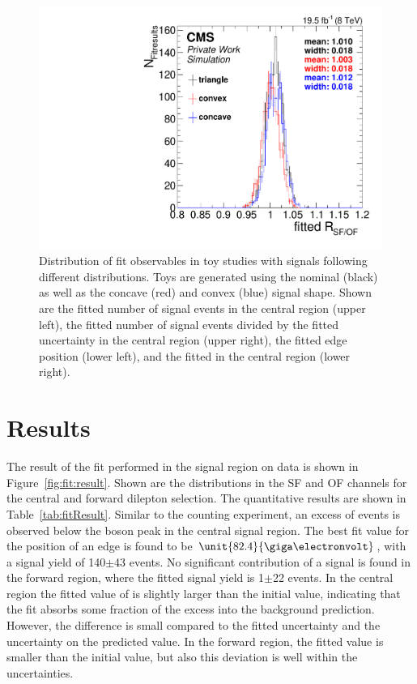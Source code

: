 \begin{figure}[!hbp]
\begin{minipage}[t]{0.49\textwidth}
  \end{minipage}
  \begin{minipage}[t]{0.49\textwidth}
    \includegraphics[width=\textwidth]{plots/results/fit/toyResults/rSFOF_shapeBias.pdf}
  \end{minipage}
  \caption{Distribution of fit observables in toy studies with signals following different distributions. Toys are generated using the nominal (black) as well as the concave (red) and convex (blue) signal shape. Shown are the fitted number of signal events in the central region (upper left), the fitted number of signal events divided by the fitted uncertainty in the central region (upper right), the fitted edge position (lower left), and the fitted \Rsfof in the central region (lower right).}
  \label{fig:toys:signalInjectedShapeBias}
\end{figure}
\clearpage
\section{Results}
The result of the fit performed in the signal region on data is shown in Figure~\ref{fig:fit:result}. Shown are the \mll distributions in the SF and OF channels for the central and forward dilepton selection. The quantitative results are shown in Table~\ref{tab:fitResult}. Similar to the counting experiment, an excess of events is observed below the \Z boson peak in the central signal region. The best fit value for the position of an edge is found to be $\unit{82.4}{\giga\electronvolt}$, with a signal yield of 140$\pm$43 events. No significant contribution of a signal is found in the forward region, where the fitted signal yield is 1$\pm$22 events. In the central region the fitted value of \Rsfof is slightly larger than the initial value, indicating that the fit absorbs some fraction of the excess into the background prediction. However, the difference is small compared to the fitted uncertainty and the uncertainty on the predicted value. In the forward region, the fitted value is smaller than the initial value, but also this deviation is well within the uncertainties. 


